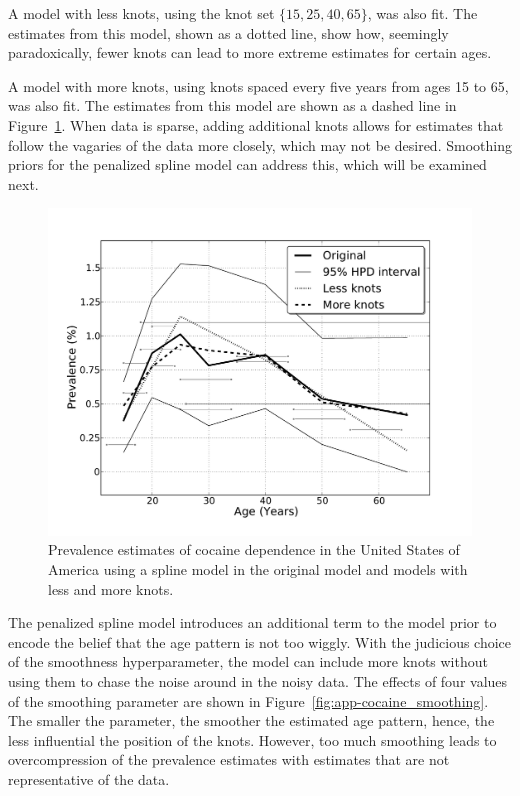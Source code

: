 A model with less knots, using the knot set $\{15, 25, 40, 65\}$,
was also fit.  The estimates from this model, shown as a dotted line,
show how, seemingly paradoxically, fewer knots can lead to more
extreme estimates for certain ages.

A model with more knots, using knots spaced every five years from
ages 15 to 65, was also fit.
The estimates from this model are shown as a dashed line in
Figure~\ref{fig:app-cocaine_knots}.  When data is sparse, adding
additional knots allows for estimates that follow the vagaries of the
data more closely, which may not be desired.  Smoothing priors for the
penalized spline model can address this, which will be examined next.

    \begin{figure}[h]
        \begin{center}
            \includegraphics[width=\textwidth]{applications/cocaine_dependence-knots.pdf}
            \caption{Prevalence estimates of cocaine dependence in the United
              States of America using a spline model in the original
              model and models with less and more knots. }
        \label{fig:app-cocaine_knots}
        \end{center}
    \end{figure}

The penalized spline model introduces an additional term to the model
prior to encode the belief that the age pattern is not too wiggly.
With the judicious choice of the smoothness hyperparameter, the model
can include more knots without using them to chase the noise around in
the noisy data.  The effects of four values of the smoothing parameter
are shown in Figure~\ref{fig:app-cocaine_smoothing}.  The smaller the
parameter, the smoother the estimated age pattern, hence, the less
influential the position of the knots.  However, too much smoothing
leads to overcompression of the prevalence estimates with estimates
that are not representative of the data.

